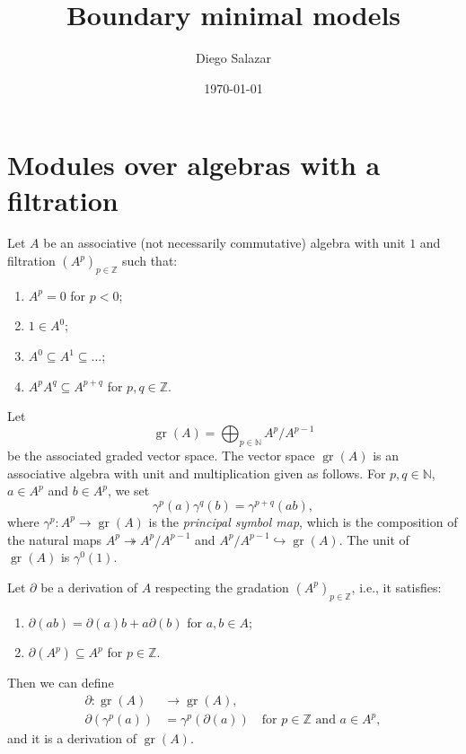 \documentclass[a4paper, 12pt, reqno]{amsart}
\DeclareMathOperator{\gr}{gr}
\begin{document}
\title{Boundary minimal models}
\author{Diego Salazar}
\address{Instituto de Matemática Pura e Aplicada, Rio de Janeiro, RJ, Brazil}
\date{\today}
\maketitle

\section{Modules over algebras with a filtration}
\label{sec:modul-over-algebr}

Let $A$ be an associative (not necessarily commutative) algebra with unit $1$ and filtration $(A^p)_{p \in \mathbb{Z}}$ such that:
\begin{enumerate}
\item $A^p = 0$ for $p < 0$;
\item $1 \in A^0$;
\item $A^0 \subseteq A^1 \subseteq \dots$;
\item $A^pA^q \subseteq A^{p + q}$ for $p, q \in \mathbb{Z}$.
\end{enumerate}
Let
\begin{equation*}
  \gr(A) = \bigoplus_{p \in \mathbb{N}}A^p/A^{p - 1}
\end{equation*}
be the associated graded vector space.
The vector space $\gr(A)$ is an associative algebra with unit and multiplication given as follows.
For $p, q \in \mathbb{N}$, $a \in A^p$ and $b \in A^p$, we set
\begin{equation*}
  \gamma^p(a)\gamma^q(b) = \gamma^{p + q}(ab),
\end{equation*}
where $\gamma^p: A^p \to \gr(A)$ is the \emph{principal symbol map}, which is the composition of the natural maps $A^p \twoheadrightarrow A^p/A^{p - 1}$ and $A^p/A^{p - 1} \hookrightarrow \gr(A)$.
The unit of $\gr(A)$ is $\gamma^0(1)$.

Let $\partial$ be a derivation of $A$ respecting the gradation $(A^p)_{p \in \mathbb{Z}}$, i.e., it satisfies:
\begin{enumerate}
\item $\partial(ab) = \partial(a)b + a\partial(b)$ for $a, b \in A$;
\item $\partial(A^p) \subseteq A^p$ for $p \in \mathbb{Z}$.
\end{enumerate}
Then we can define
\begin{align*}
  \partial: \gr(A) &\to \gr(A), \\
  \partial(\gamma^p(a)) &= \gamma^p(\partial(a)) \quad \text{for $p \in \mathbb{Z}$ and $a \in A^p$},
\end{align*}
and it is a derivation of $\gr(A)$.
\end{document}
